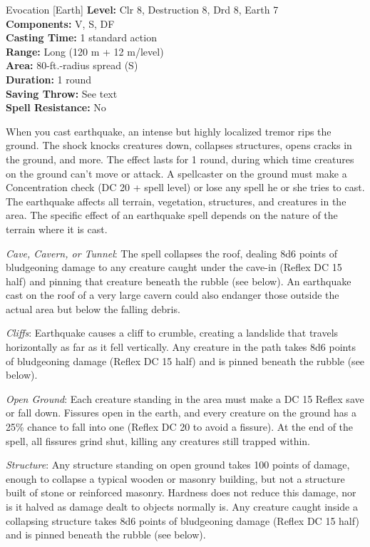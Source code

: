{Evocation [Earth]}
{
	\textbf{Level:}
	Clr 8, Destruction 8, Drd 8, Earth 7\\
	\textbf{Components:}
	V, S, DF\\
	\textbf{Casting Time:}
	1 standard action\\
	\textbf{Range:}
	Long (120 m + 12 m/level)\\
	\textbf{Area:}
	80-ft.-radius spread (S)\\
	\textbf{Duration:}
	1 round\\
	\textbf{Saving Throw:}
	See text\\
	\textbf{Spell Resistance:}
	No\\
}
{
	When you cast earthquake, an intense but highly localized tremor rips the ground. The shock knocks creatures down, collapses structures, opens cracks in the ground, and more. The effect lasts for 1 round, during which time creatures on the ground can't move or attack. A spellcaster on the ground must make a Concentration check (DC 20 + spell level) or lose any spell he or she tries to cast. The earthquake affects all terrain, vegetation, structures, and creatures in the area. The specific effect of an earthquake spell depends on the nature of the terrain where it is cast.

	\textit{Cave, Cavern, or Tunnel}:
	The spell collapses the roof, dealing 8d6 points of bludgeoning damage to any creature caught under the cave-in (Reflex DC 15 half) and pinning that creature beneath the rubble (see below). An earthquake cast on the roof of a very large cavern could also endanger those outside the actual area but below the falling debris.

	\textit{Cliffs}:
	Earthquake causes a cliff to crumble, creating a landslide that travels horizontally as far as it fell vertically. Any creature in the path takes 8d6 points of bludgeoning damage (Reflex DC 15 half) and is pinned beneath the rubble (see below).

	\textit{Open Ground}:
	Each creature standing in the area must make a DC 15 Reflex save or fall down. Fissures open in the earth, and every creature on the ground has a 25\% chance to fall into one (Reflex DC 20 to avoid a fissure). At the end of the spell, all fissures grind shut, killing any creatures still trapped within.

	\textit{Structure}:
	Any structure standing on open ground takes 100 points of damage, enough to collapse a typical wooden or masonry building, but not a structure built of stone or reinforced masonry. Hardness does not reduce this damage, nor is it halved as damage dealt to objects normally is. Any creature caught inside a collapsing structure takes 8d6 points of bludgeoning damage (Reflex DC 15 half) and is pinned beneath the rubble (see below).

}
